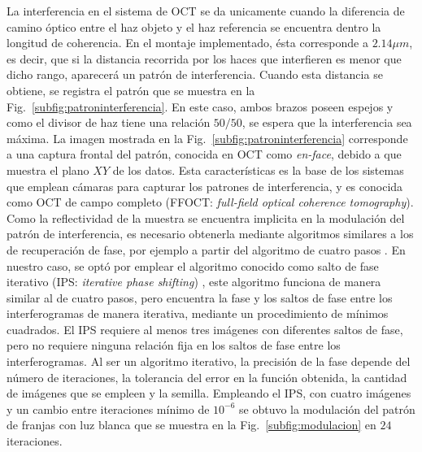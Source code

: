 La interferencia en el sistema de OCT se da unicamente cuando la diferencia de camino óptico entre el haz objeto y el haz referencia se encuentra dentro la longitud de coherencia. En el montaje implementado, ésta corresponde a $2.14\mu m$, es decir, que si la distancia recorrida por los haces que interfieren es menor que dicho rango, aparecerá un patrón de interferencia. Cuando esta distancia se obtiene, se registra el patrón que se muestra en la Fig.~\ref{subfig:patroninterferencia}. En este caso, ambos brazos poseen espejos y como el divisor de haz tiene una relación $50/50$, se espera que la interferencia sea máxima. La imagen mostrada en la Fig.~\ref{subfig:patroninterferencia} corresponde a una captura frontal del patrón, conocida en OCT como \textit{en-face}, debido a que muestra el plano $XY$ de los datos. Esta características es la base de los sistemas que emplean cámaras para capturar los patrones de interferencia, y es conocida como OCT de campo completo (FFOCT: \textit{full-field optical coherence tomography}). Como la reflectividad de la muestra se encuentra implicita en la modulación del patrón de interferencia, es necesario obtenerla mediante algoritmos similares a los de recuperación de fase, por ejemplo a partir del algoritmo de cuatro pasos \cite{Malacara1992}. En nuestro caso, se optó por emplear el algoritmo conocido como salto de fase iterativo (IPS: \textit{iterative phase shifting}) \cite{Wang2004}, este algoritmo funciona de manera similar al de cuatro pasos, pero encuentra la fase y los saltos de fase entre los interferogramas de manera iterativa, mediante un procedimiento de mínimos cuadrados. El IPS requiere al menos tres imágenes con diferentes saltos de fase, pero no requiere ninguna relación fija en los saltos de fase entre los interferogramas. Al ser un algoritmo iterativo, la precisión de la fase depende del número de iteraciones, la tolerancia del error en la función obtenida, la cantidad de imágenes que se empleen y la semilla. Empleando el IPS, con cuatro imágenes y un cambio entre iteraciones mínimo de $10^{-6}$ se obtuvo la modulación del patrón de franjas con luz blanca que se muestra en la Fig.~\ref{subfig:modulacion} en $24$ iteraciones.

